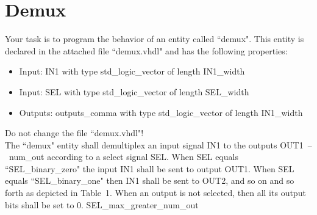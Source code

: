 \documentclass[a4paper,12pt]{article}
\begin{document}
\pagestyle{empty}
\setlength{\parindent}{0em} 
\section*{\noindent Demux }
Your task is to program the behavior of an entity called ``demux". This entity is declared in the attached file ``demux.vhdl" and has the following properties:

\begin{itemize}
	\item Input: IN1 with type std\_logic\_vector of length {{IN1_width}}
	\item Input: SEL with type std\_logic\_vector of length {{SEL_width}}
	\item Outputs: {{outputs_comma}} with type std\_logic\_vector of length {{IN1_width}}
\end{itemize}

\begin{center}
\end{center}

Do not change the file ``demux.vhdl"!\\

The ``demux" entity shall demultiplex an input signal IN1 to the outputs \mbox{OUT1 -- {{num_out}}} according to a select signal SEL. When SEL equals ``{{SEL_binary_zero}}" the input IN1 shall be sent to output OUT1. When SEL equals ``{{SEL_binary_one}}" then IN1 shall be sent to OUT2, and so on and so forth as depicted in Table~1. When an output is not selected, then all its output bits shall be set to 0. {{SEL_max_greater_num_out}}
\end{document}
